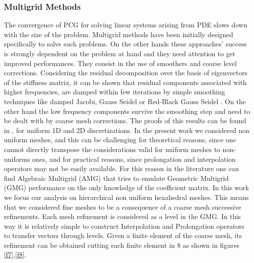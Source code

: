 \subsubsection{Multigrid Methods}
\label{multigrid}
The convergence of PCG for solving linear systems arising from PDE slows down with the size of the problem. Multigrid methods \cite{trottenberg2001multigrid} have been initially designed specifically to solve such problems. On the other hands these approaches' success is strongly dependent on the problem at hand and they need attention to get improved performances. They consist in the use of smoothers and coarse level corrections. 
Considering the residual decomposition over the basis of eigenvectors of the stiffness matrix, it can be shown that residual components associated with higher frequencies, are damped within few iterations by simple smoothing techniques like damped Jacobi, Gauss Seidel or Red-Black Gauss Seidel \cite{saad2003iterative}. On the other hand the low frequency components survive the smoothing step and need to be dealt with by coarse mesh corrections. The proofs of this results can be found in \cite{saad2003iterative}, for uniform 1D and 2D discretizations. In the present work we considered non uniform meshes, and this can be challenging for theoretical reasons, since one cannot directly transpose the considerations valid for uniform meshes to non-uniforms ones, and for practical reasons, since prolongation and interpolation operators may not be easily available. For this reason in the literature one can find Algebraic Multigrid (AMG) \cite{stuben2001review} that tries to emulate Geometric Multigrid (GMG) performance on the only knowledge of the coefficient matrix. In this work we focus our analysis on hierarchical non uniform hexahedral meshes.  This means that we considered fine meshes to be a consequence of a coarse mesh successive refinements. Each mesh refinement is considered as a level in the GMG.
In this way it is relatively simple to construct Interpolation and Prolongation operators to transfer vectors through levels.
Given a finite element of the coarse mesh, its refinement can be obtained cutting each finite element in 8 as shown in figures
\ref{f7},\ref{f8}.  
